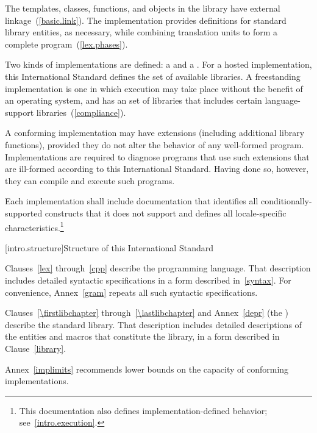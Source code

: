 \pnum
The templates, classes, functions, and objects in the library have
external linkage~(\ref{basic.link}). The implementation provides
definitions for standard library entities, as necessary, while combining
translation units to form a complete \Cpp  program~(\ref{lex.phases}).%

\pnum
Two kinds of implementations are defined: a  and a
. For a hosted implementation, this
International Standard defines the set of available libraries. A freestanding
implementation is one in which execution may take place without the benefit of
an operating system, and has an  set of libraries that includes certain language-support
libraries~(\ref{compliance}).

\pnum
A conforming implementation may have extensions (including
additional library functions), provided they do not alter the
behavior of any well-formed program.
Implementations are required to diagnose programs that use such
extensions that are ill-formed according to this International Standard.
Having done so, however, they can compile and execute such programs.

\pnum
Each implementation shall include documentation that identifies all
conditionally-supported constructs
that it does not support and defines all locale-specific characteristics.\footnote{This documentation also defines implementation-defined behavior;
see~\ref{intro.execution}.}%
%
%

[intro.structure]{Structure of this International Standard}

\pnum
{}%
%
Clauses~\ref{lex} through~\ref{cpp} describe the \Cpp  programming
language. That description includes detailed syntactic specifications in
a form described in~\ref{syntax}. For convenience, Annex~\ref{gram}
repeats all such syntactic specifications.

\pnum
Clauses~\ref{\firstlibchapter} through~\ref{\lastlibchapter} and Annex~\ref{depr}
(the ) describe the \Cpp standard library.
That description includes detailed descriptions of the
entities and macros
that constitute the library, in a form described in Clause~\ref{library}.

\pnum
Annex~\ref{implimits} recommends lower bounds on the capacity of conforming
implementations.

